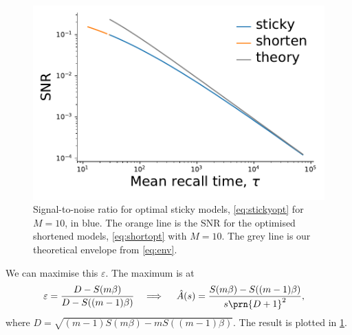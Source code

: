 \documentclass[12pt]{article}
\begin{document}
\begin{figure}[ht]
\begin{center}
  \includegraphics[width=0.4\linewidth]{sticky_opt.pdf}
\caption[Signal-to-noise ratio for optimal sticky models]
{Signal-to-noise ratio for optimal sticky models, \cref{eq:stickyopt} for \(M=10\), in blue.
  The orange line is the SNR for the optimised shortened models, \cref{eq:shortopt} with \(M=10\).
  The grey line is our theoretical envelope from \cref{eq:env}.
  \label{fig:sticky}}
\end{center}
\end{figure}

We can maximise this \wrt \(\varepsilon\).
%
The maximum is at
%
\begin{equation}\label{eq:stickyopt}
\begin{aligned}
  \varepsilon 
    &= \frac{D - S(m\beta)}{D - S((m-1)\beta)} &
  \implies \quad
  \hat{A}(s) 
    &= \frac{S(m\beta) - S((m-1)\beta)}{s\prn{D + 1}^2} ,
\end{aligned}
\end{equation}
%
where \( D = \sqrt{(m-1)S(m\beta) - m S((m-1)\beta)} \).
The result is plotted in \cref{fig:sticky}.
\end{document}

